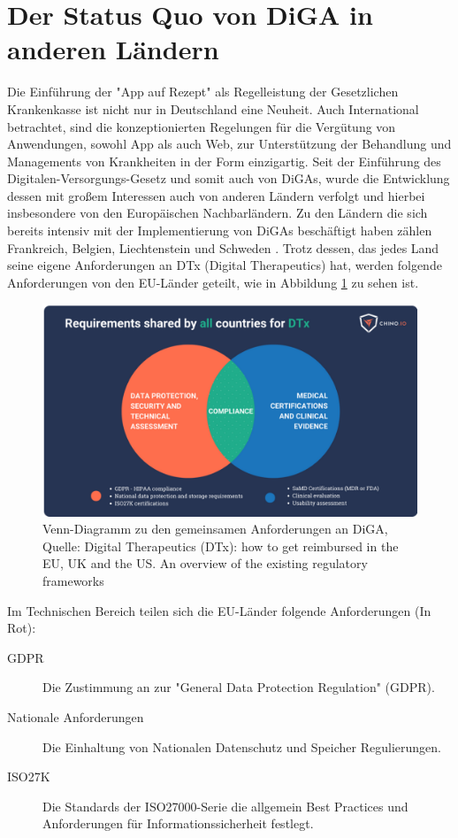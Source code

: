 \documentclass{article}
\begin{document}
	\section{Der Status Quo von DiGA in anderen Ländern}
		Die Einführung der "App auf Rezept" als Regelleistung der Gesetzlichen Krankenkasse ist nicht nur in Deutschland eine Neuheit. Auch International betrachtet, sind die konzeptionierten Regelungen für die Vergütung von Anwendungen, sowohl App als auch Web, zur Unterstützung der Behandlung und Managements von Krankheiten in der Form einzigartig. Seit der Einführung des Digitalen-Versorgungs-Gesetz und somit auch von DiGAs, wurde die Entwicklung dessen mit großem Interessen auch von anderen Ländern verfolgt und hierbei insbesondere von den Europäischen Nachbarländern. Zu den Ländern die sich bereits intensiv mit der Implementierung von DiGAs beschäftigt haben zählen Frankreich, Belgien, Liechtenstein und Schweden \cite[vgl. S.25-26]{TK-diga-report-1}. Trotz dessen, das jedes Land seine eigene Anforderungen an DTx (Digital Therapeutics) hat, werden folgende Anforderungen von den EU-Länder geteilt, wie in Abbildung \ref{Abb-venn-diagramm} zu sehen ist. 
		\begin{figure}
			\centering
			\includegraphics[width=\textwidth]{./grafiken/venn_diagramm_anforderungen}
			\caption[Abbildung zu geteilten Anforderungen]{Venn-Diagramm zu den gemeinsamen Anforderungen an DiGA, Quelle: Digital Therapeutics (DTx): how to get reimbursed in the EU, UK and the US. An overview of the existing regulatory frameworks \cite{dtx-regulatory-frameworks}}
			\label{Abb-venn-diagramm}
		\end{figure}
		\newpage 
		Im Technischen Bereich teilen sich die EU-Länder folgende Anforderungen (In Rot):
		\begin{description}
			\item[GDPR] Die Zustimmung an zur "General Data Protection Regulation" (GDPR).
			\item[Nationale Anforderungen] Die Einhaltung von Nationalen Datenschutz und Speicher Regulierungen.
			\item[ISO27K] Die Standards der ISO27000-Serie die allgemein Best Practices und Anforderungen für Informationssicherheit festlegt.   
		\end{description}
\end{document}
